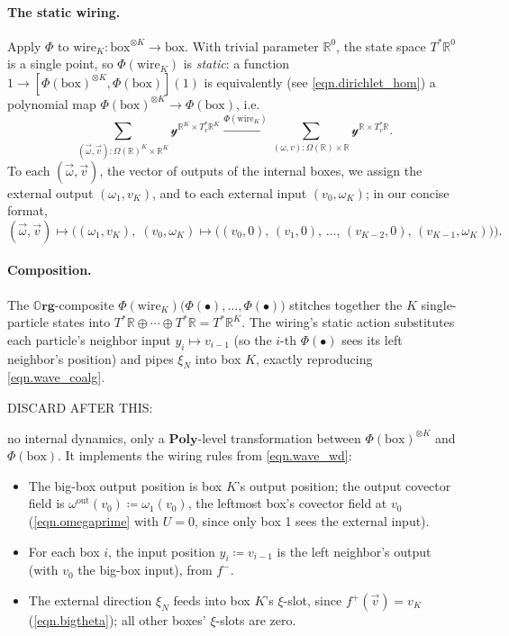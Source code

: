 \documentclass[11pt, oneside, article]{memoir}
\theoremstyle{definition}
\theoremstyle{plain}
\newcommand{\Cat}[1]{\mathbf{#1}}%
\newcommand{\fun}[1]{\mathrm{#1}}%
\newcommand{\To}[2][]{\xrightarrow[#1]{#2}}
\newcommand{\rr}{\mathbb{R}}
\newcommand{\yon}{\mathcal{y}}
\newcommand{\poly}{\Cat{Poly}}
\newcommand{\org}{{\mathbb{O}\Cat{rg}}}
\newcommand{\Part}{\bullet}
\newcommand{\boxob}{\mathrm{box}}
\newcommand{\inpt}[1]{#1^{-}}
\newcommand{\outp}[1]{#1^{+}}
\begin{document}
\paragraph{The static wiring.}

Apply $\Phi$ to $\fun{wire}_K\colon\boxob^{\otimes K}\to\boxob$. With trivial parameter $\rr^0$, the state space $T^*\rr^0$ is a single point, so $\Phi(\fun{wire}_K)$ is \emph{static}: a function $1\to[\Phi(\boxob)^{\otimes K},\Phi(\boxob)](1)$ is equivalently (see \eqref{eqn.dirichlet_hom}) a polynomial map $\Phi(\boxob)^{\otimes K}\to\Phi(\boxob)$, i.e.\
\[\sum_{(\vec\omega,\vec v):\Omega(\rr)^K\times\rr^K}\yon^{\rr^K\times T^*_v\rr^K}\To{\Phi(\fun{wire}_K)}\sum_{(\omega,v):\Omega(\rr)\times\rr}\yon^{\rr\times T^*_v\rr}.\]
To each $(\vec \omega,\vec v)$, the vector of outputs of the internal boxes, we assign the external output $(\omega_1,v_K)$, and to each external input $(v_0,\omega_K)$; in our concise format,
\[
(\vec \omega,\vec v)\mapsto\Big((\omega_1,v_K),\;(v_0,\omega_K)\mapsto\bigl((v_0,0),\,(v_1,0),\,\ldots,\,(v_{K-2},0),\,(v_{K-1},\omega_K)\bigr)\Big).
\]


\paragraph{Composition.}

The $\org$-composite $\Phi(\fun{wire}_K)\bigl(\Phi(\Part),\ldots,\Phi(\Part)\bigr)$ stitches together the $K$ single-particle states into $T^*\rr\oplus\cdots\oplus T^*\rr=T^*\rr^K$. The wiring's static action substitutes each particle's neighbor input $y_i\mapsto v_{i-1}$ (so the $i$-th $\Phi(\Part)$ sees its left neighbor's position) and pipes $\xi_N$ into box $K$, exactly reproducing \eqref{eqn.wave_coalg}.

DISCARD AFTER THIS:

no internal dynamics, only a $\poly$-level transformation between $\Phi(\boxob)^{\otimes K}$ and $\Phi(\boxob)$. It implements the wiring rules from \eqref{eqn.wave_wd}:
\begin{itemize}
\item The big-box output position is box $K$'s output position; the output covector field is $\omega^{\mathrm{out}}(v_0)\coloneqq\omega_1(v_0)$, the leftmost box's covector field at $v_0$ (\eqref{eqn.omegaprime} with $U=0$, since only box 1 sees the external input).
\item For each box $i$, the input position $y_i\coloneqq v_{i-1}$ is the left neighbor's output (with $v_0$ the big-box input), from $\inpt f$.
\item The external direction $\xi_N$ feeds into box $K$'s $\xi$-slot, since $\outp f(\vec v)=v_K$ (\eqref{eqn.bigtheta}); all other boxes' $\xi$-slots are zero.
\end{itemize}
\end{document}
